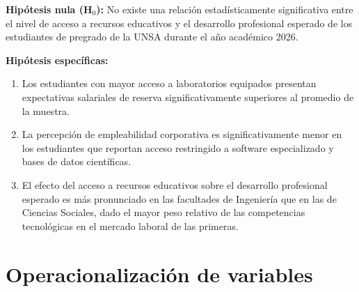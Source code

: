 \documentclass[11pt, a4paper]{article}
\begin{document}
\textbf{Hipótesis nula (H$_0$):} No existe una relación estadísticamente significativa entre el nivel de acceso a recursos educativos y el desarrollo profesional esperado de los estudiantes de pregrado de la UNSA durante el año académico 2026.

\textbf{Hipótesis específicas:}
\begin{enumerate}
    \item Los estudiantes con mayor acceso a laboratorios equipados presentan expectativas salariales de reserva significativamente superiores al promedio de la muestra.
    \item La percepción de empleabilidad corporativa es significativamente menor en los estudiantes que reportan acceso restringido a software especializado y bases de datos científicas.
    \item El efecto del acceso a recursos educativos sobre el desarrollo profesional esperado es más pronunciado en las facultades de Ingeniería que en las de Ciencias Sociales, dado el mayor peso relativo de las competencias tecnológicas en el mercado laboral de las primeras.
\end{enumerate}

\section{Operacionalización de variables}
\end{document}
